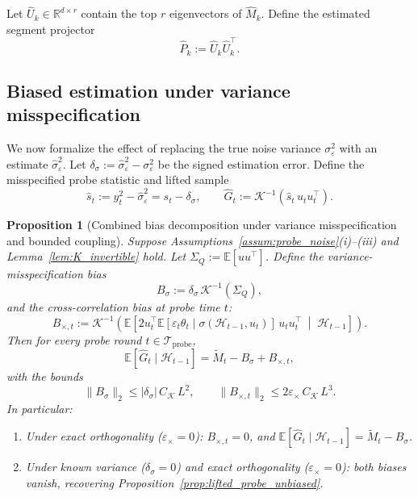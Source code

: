 \documentclass[12pt]{article}
\newcommand{\R}{\mathbb{R}}
\newcommand{\E}{\mathbb{E}}
\newcommand{\cH}{\mathcal{H}}
\newcommand{\cTprobe}{\mathcal{T}_{\mathrm{probe}}}
\newtheorem{proposition}{Proposition}
\theoremstyle{plain}
\theoremstyle{definition}
\begin{document}
Let $\widehat{U}_k \in \R^{d \times r}$ contain the top $r$ eigenvectors of $\widehat{M}_k$. Define the estimated segment projector
\begin{equation}
\widehat{P}_k := \widehat{U}_k \widehat{U}_k^\top.
\label{eq:Phat_k}
\end{equation}

\subsection{Biased estimation under variance misspecification}

We now formalize the effect of replacing the true noise variance $\sigma_\varepsilon^2$ with an estimate $\hat\sigma_\varepsilon^2$. Let $\delta_\sigma := \hat\sigma_\varepsilon^2 - \sigma_\varepsilon^2$ be the signed estimation error. Define the misspecified probe statistic and lifted sample
\begin{equation}
\hat{s}_t := y_t^2 - \hat\sigma_\varepsilon^2 = s_t - \delta_\sigma,
\qquad
\hat{G}_t := \mathcal{K}^{-1}(\hat{s}_t\, u_t u_t^\top).
\label{eq:misspec_statistic}
\end{equation}

\begin{proposition}[Combined bias decomposition under variance misspecification and bounded coupling]
\label{prop:biased_measurement}
Suppose Assumptions~\ref{assum:probe_noise}(i)--(iii) and Lemma~\ref{lem:K_invertible} hold. Let $\Sigma_Q := \E[uu^\top]$. Define the variance-misspecification bias
\[
B_\sigma := \delta_\sigma\, \mathcal{K}^{-1}(\Sigma_Q),
\]
and the cross-correlation bias at probe time $t$:
\[
B_{\times,t} := \mathcal{K}^{-1}\!\left(\E\!\left[2u_t^\top \E[\varepsilon_t \theta_t \mid \sigma(\cH_{t-1}, u_t)]\, u_t u_t^\top \;\middle|\; \cH_{t-1}\right]\right).
\]
Then for every probe round $t \in \cTprobe$,
\begin{equation}
\E[\hat{G}_t \mid \cH_{t-1}] = \widetilde{M}_t - B_\sigma + B_{\times,t},
\label{eq:biased_Gt}
\end{equation}
with the bounds
\begin{equation}
\|B_\sigma\|_2 \le |\delta_\sigma|\, C_{\mathcal{K}}\, L^2,
\qquad
\|B_{\times,t}\|_2 \le 2\varepsilon_\times\, C_{\mathcal{K}}\, L^3.
\label{eq:bias_bound}
\end{equation}
In particular:
\begin{enumerate}[nosep,label=(\alph*)]
\item Under exact orthogonality ($\varepsilon_\times = 0$): $B_{\times,t} = 0$, and $\E[\hat{G}_t \mid \cH_{t-1}] = \widetilde{M}_t - B_\sigma$.
\item Under known variance ($\delta_\sigma = 0$) and exact orthogonality ($\varepsilon_\times = 0$): both biases vanish, recovering Proposition~\ref{prop:lifted_probe_unbiased}.
\end{enumerate}
\end{proposition}
\end{document}
